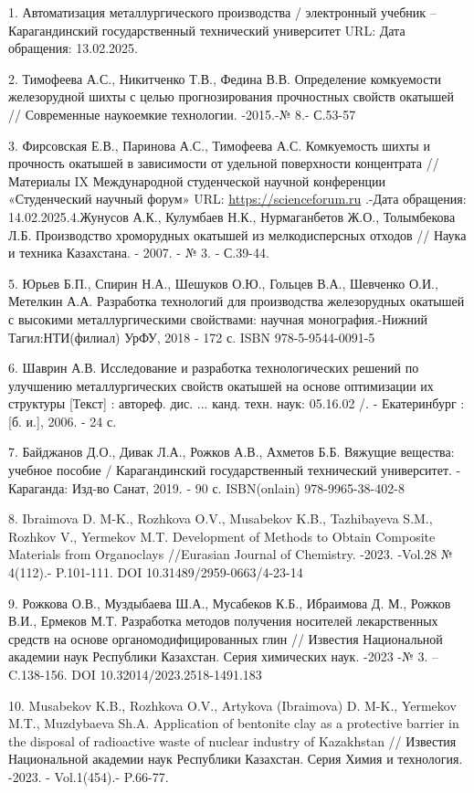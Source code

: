 \begin{references}
1. Автоматизация металлургического производства / электронный учебник --
Карагандинский государственный технический университет URL:
\href{https://www.kstu.kz/wp-content/uploads/2018/05/tsifrovaya-mitallurgiya/el-uch-po-ampr/index.htm-}{}
Дата обращения: 13.02.2025.

2. Тимофеева А.С., Никитченко Т.В., Федина В.В. Определение комкуемости
железорудной шихты с целью прогнозирования прочностных свойств окатышей
// Современные наукоемкие технологии. -2015.-№ 8.- С.53-57

3. Фирсовская Е.В., Паринова А.С., Тимофеева А.С. Комкуемость шихты и
прочность окатышей в зависимости от удельной поверхности концентрата
//Материалы IX Международной студенческой научной конференции
«Студенческий научный форум» URL:
\href{https://scienceforum.ru/2017/article/2017038139}{https://scienceforum.ru} .-Дата обращения:
14.02.2025.4.Жунусов А.К., Кулумбаев Н.К., Нурмаганбетов Ж.О., Толымбекова Л.Б.
Производство хроморудных окатышей из мелкодисперсных отходов // Наука и
техника Казахстана. - 2007. - № 3. - С.39-44.

5. Юрьев Б.П., Спирин Н.А., Шешуков О.Ю., Гольцев В.А., Шевченко О.И.,
Метелкин А.А. Разработка технологий для производства железорудных
окатышей с высокими металлургическими свойствами: научная
монография.-Нижний Тагил:НТИ(филиал) УрФУ, 2018 - 172 с. ISBN
978-5-9544-0091-5

6. Шаврин А.В. Исследование и разработка технологических решений по
улучшению металлургических свойств окатышей на основе оптимизации их
структуры {[}Текст{]} : автореф. дис. ... канд. техн. наук: 05.16.02 /.
- Екатеринбург : {[}б. и.{]}, 2006. - 24 с.

7. Байджанов Д.О., Дивак Л.А., Рожков А.В., Ахметов Б.Б. Вяжущие
вещества: учебное пособие / Карагандинский государственный технический
университет. - Караганда: Изд-во Санат, 2019. - 90 с. ISBN(onlain)
978-9965-38-402-8

8. Ibraimova D. M-K., Rozhkova O.V., Musabekov K.B., Tazhibayeva S.M.,
Rozhkov V., Yermekov M.T. Development of Methods to Obtain Composite
Materials from Organoclays //Eurasian Journal of Chemistry. -2023.
-Vol.28 № 4(112).- P.101-111. DOI 10.31489/2959-0663/4-23-14

9. Рожкова О.В., Муздыбаева Ш.А., Мусабеков К.Б., Ибраимова Д. М., Рожков
В.И., Ермеков М.Т. Разработка методов получения носителей лекарственных
средств на основе органомодифицированных глин // Известия Национальной
академии наук Республики Казахстан. Серия химических наук. -2023 -№ 3.
-- C.138-156. DOI 10.32014/2023.2518-1491.183

10. Musabekov K.B., Rozhkova O.V., Artykova (Ibraimova) D. M-K., Yermekov
M.T., Muzdybaeva Sh.A. Application of bentonite clay as a protective
barrier in the disposal of radioactive waste of nuclear industry of
Kazakhstan // Известия Национальной академии наук Республики Казахстан.
Серия Химия и технология. -2023. - Vol.1(454).- P.66-77.
\href{https://doi.org/10.32014/2023.2518-1491.148}{}
\end{references}

